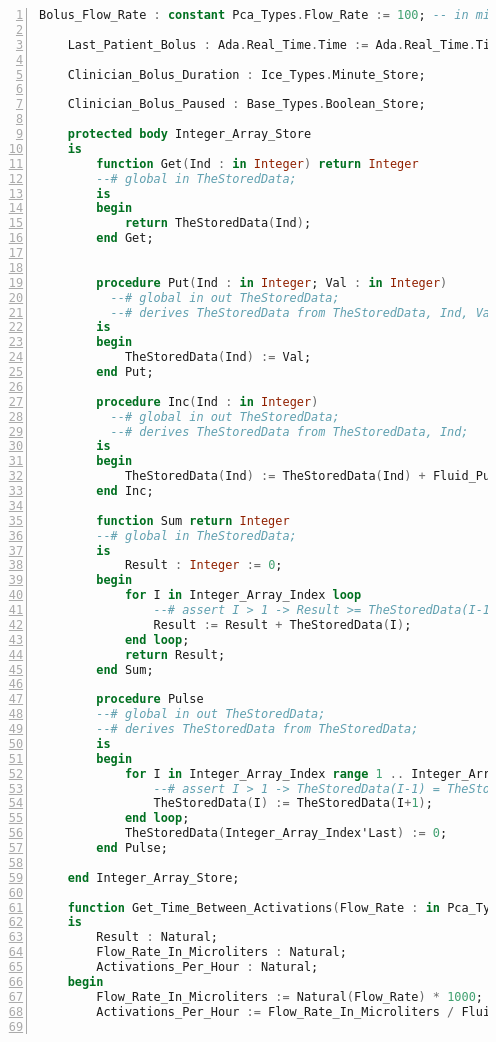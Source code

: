 \begin{lstlisting}[language=ada, gobble=0, numbers=left, caption={\lstinline{Pca_Operation} package}, label={listing:pca_ravenscar:pca_operation}]
    Bolus_Flow_Rate : constant Pca_Types.Flow_Rate := 100; -- in mililiters

    Last_Patient_Bolus : Ada.Real_Time.Time := Ada.Real_Time.Time_First;

    Clinician_Bolus_Duration : Ice_Types.Minute_Store;

    Clinician_Bolus_Paused : Base_Types.Boolean_Store;

    protected body Integer_Array_Store
    is
        function Get(Ind : in Integer) return Integer
        --# global in TheStoredData;
        is
        begin
            return TheStoredData(Ind);
        end Get;


        procedure Put(Ind : in Integer; Val : in Integer)
          --# global in out TheStoredData;
          --# derives TheStoredData from TheStoredData, Ind, Val;
        is
        begin
            TheStoredData(Ind) := Val;
        end Put;

        procedure Inc(Ind : in Integer)
          --# global in out TheStoredData;
          --# derives TheStoredData from TheStoredData, Ind;
        is
        begin
            TheStoredData(Ind) := TheStoredData(Ind) + Fluid_Pulse_Volume;
        end Inc;

        function Sum return Integer
        --# global in TheStoredData;
        is
            Result : Integer := 0;
        begin
            for I in Integer_Array_Index loop
                --# assert I > 1 -> Result >= TheStoredData(I-1);
                Result := Result + TheStoredData(I);
            end loop;
            return Result;
        end Sum;

        procedure Pulse
        --# global in out TheStoredData;
        --# derives TheStoredData from TheStoredData;
        is
        begin
            for I in Integer_Array_Index range 1 .. Integer_Array_Index'Last-1 loop
                --# assert I > 1 -> TheStoredData(I-1) = TheStoredData(I);
                TheStoredData(I) := TheStoredData(I+1);
            end loop;
            TheStoredData(Integer_Array_Index'Last) := 0;
        end Pulse;

    end Integer_Array_Store;

    function Get_Time_Between_Activations(Flow_Rate : in Pca_Types.Flow_Rate) return Natural
    is
        Result : Natural;
        Flow_Rate_In_Microliters : Natural;
        Activations_Per_Hour : Natural;
    begin
        Flow_Rate_In_Microliters := Natural(Flow_Rate) * 1000; -- convert mL to uL
        Activations_Per_Hour := Flow_Rate_In_Microliters / Fluid_Pulse_Volume;


\end{lstlisting}
